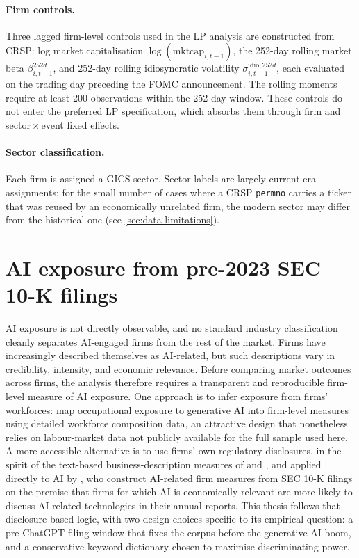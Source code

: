 \paragraph{Firm controls.} Three lagged firm-level controls used in the LP analysis are constructed from CRSP: log market capitalisation $\log(\text{mktcap}_{i,t-1})$, the 252-day rolling market beta $\beta^{252d}_{i,t-1}$, and 252-day rolling idiosyncratic volatility $\sigma^{\text{idio},252d}_{i,t-1}$, each evaluated on the trading day preceding the FOMC announcement. The rolling moments require at least 200 observations within the 252-day window. These controls do not enter the preferred LP specification, which absorbs them through firm and sector\,$\times$\,event fixed effects.

\paragraph{Sector classification.} Each firm is assigned a GICS sector. Sector labels are largely current-era assignments; for the small number of cases where a CRSP \texttt{permno} carries a ticker that was reused by an economically unrelated firm, the modern sector may differ from the historical one (see \cref{sec:data-limitations}).

\section{AI exposure from pre-2023 SEC 10-K filings}
\label{sec:ai-exposure}

AI exposure is not directly observable, and no standard industry classification cleanly separates AI-engaged firms from the rest of the market. Firms have increasingly described themselves as AI-related, but such descriptions vary in credibility, intensity, and economic relevance. Before comparing market outcomes across firms, the analysis therefore requires a transparent and reproducible firm-level measure of AI exposure. One approach is to infer exposure from firms' workforces: \citet{eisfeldtSchubertZhangTaska2023} map occupational exposure to generative AI into firm-level measures using detailed workforce composition data, an attractive design that nonetheless relies on labour-market data not publicly available for the full sample used here. A more accessible alternative is to use firms' own regulatory disclosures, in the spirit of the text-based business-description measures of \citet{loughranMcDonald2011} and \citet{hobergPhillips2016}, and applied directly to AI by \citet{anteSaggu2025}, who construct AI-related firm measures from SEC 10-K filings on the premise that firms for which AI is economically relevant are more likely to discuss AI-related technologies in their annual reports. This thesis follows that disclosure-based logic, with two design choices specific to its empirical question: a pre-ChatGPT filing window that fixes the corpus before the generative-AI boom, and a conservative keyword dictionary chosen to maximise discriminating power.

